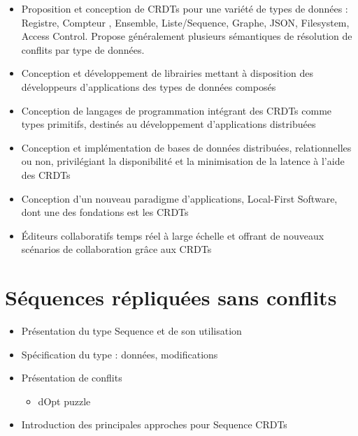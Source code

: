 \documentclass[12pt]{thesul}
\begin{document}
\begin{itemize}
  \item Proposition et conception de \acp{CRDT} pour une variété de types de données : Registre, Compteur , Ensemble, Liste/Sequence, Graphe, JSON, Filesystem, Access Control.
    Propose généralement plusieurs sémantiques de résolution de conflits par type de données.
  \item Conception et développement de librairies mettant à disposition des développeurs d'applications des types de données composés \cite{Nicolaescu2015Yjs, Nicolaescu2016YATA, yjsimplem, jsoncrdt2017, automerge}
  \item Conception de langages de programmation intégrant des CRDTs comme types primitifs, destinés au développement d'applications distribuées \cite{Meiklejohn2015Lasp2, DePorre2020cscript}
  \item Conception et implémentation de bases de données distribuées, relationnelles ou non, privilégiant la disponibilité et la minimisation de la latence à l'aide des CRDTs \cite{RiakKV, AntidoteDB, Anna2021, Concordant, yu:hal-02983557}
  \item Conception d'un nouveau paradigme d'applications, Local-First Software, dont une des fondations est les CRDTs \cite{localfirstsoftware2019, pushpin2020}
  \item Éditeurs collaboratifs temps réel à large échelle et offrant de nouveaux scénarios de collaboration grâce aux CRDTs \cite{Nedelec2016CRATE, MUTE2017}
\end{itemize}

\section{Séquences répliquées sans conflits}

\begin{itemize}
  \item Présentation du type Sequence et de son utilisation
  \item Spécification du type : données, modifications
  \item Présentation de conflits
  \begin{itemize}
    \item dOpt puzzle
  \end{itemize}
  \item Introduction des principales approches pour Sequence \acp{CRDT}
\end{itemize}
\end{document}
